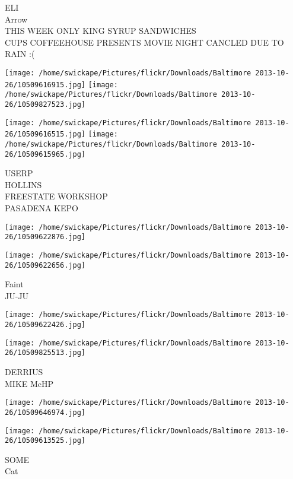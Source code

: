 \documentclass[10pt,letterpaper]{article}
\begin{document}
ELI\\
Arrow\\
THIS WEEK ONLY KING SYRUP SANDWICHES\\
CUPS COFFEEHOUSE PRESENTS MOVIE NIGHT CANCLED DUE TO RAIN :(\\
\pagebreak

\texttt{[image: /home/swickape/Pictures/flickr/Downloads/Baltimore 2013-10-26/10509616915.jpg]}
\texttt{[image: /home/swickape/Pictures/flickr/Downloads/Baltimore 2013-10-26/10509827523.jpg]}

\texttt{[image: /home/swickape/Pictures/flickr/Downloads/Baltimore 2013-10-26/10509616515.jpg]}
\texttt{[image: /home/swickape/Pictures/flickr/Downloads/Baltimore 2013-10-26/10509615965.jpg]}

USERP\\
HOLLINS\\
FREESTATE WORKSHOP\\
PASADENA KEPO\\
\pagebreak

\texttt{[image: /home/swickape/Pictures/flickr/Downloads/Baltimore 2013-10-26/10509622876.jpg]}

\vspace{0.25in}
\texttt{[image: /home/swickape/Pictures/flickr/Downloads/Baltimore 2013-10-26/10509622656.jpg]}

Faint\\
JU{-}JU\\
\pagebreak

\texttt{[image: /home/swickape/Pictures/flickr/Downloads/Baltimore 2013-10-26/10509622426.jpg]}

\vspace{0.25in}
\texttt{[image: /home/swickape/Pictures/flickr/Downloads/Baltimore 2013-10-26/10509825513.jpg]}

DERRIUS\\
MIKE McHP\\
\pagebreak

\texttt{[image: /home/swickape/Pictures/flickr/Downloads/Baltimore 2013-10-26/10509646974.jpg]}

\vspace{0.25in}
\texttt{[image: /home/swickape/Pictures/flickr/Downloads/Baltimore 2013-10-26/10509613525.jpg]}

SOME\\
Cat\\
\pagebreak
\end{document}
